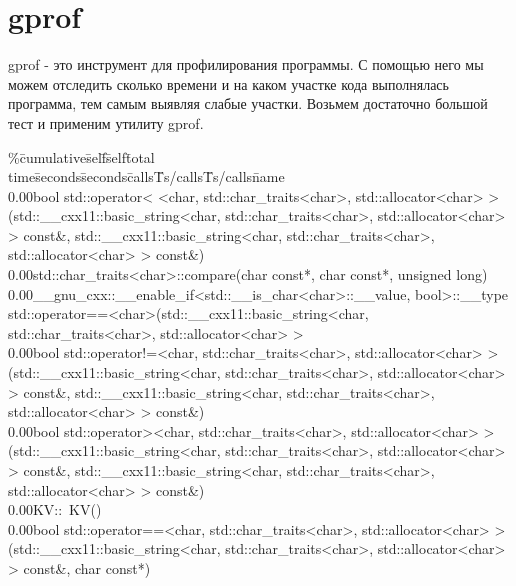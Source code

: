 \documentclass[pdf, unicode, 12pt, a4paper,oneside,fleqn]{article}
\begin{document}
\section{gprof}
gprof - это инструмент для профилирования программы. С помощью него мы можем отследить сколько времени и на каком участке кода выполнялась программа, тем самым выявляя слабые участки. Возьмем достаточно большой тест и применим утилиту gprof. \\

\begin{tabbing}
\%\quad\=cumulative\quad\=self\quad\=\qquad\qquad\qquad\=self\qquad\=total\\
time\quad\=seconds\quad\=seconds\quad\=calls\quad\=Ts/calls\quad\=Ts/calls\quad\=name\\
0.00\>bool std::operator< <char, std::char\_traits<char>, std::allocator<char> >(std::\_\_cxx11::basic\_string<char, std::char\_traits<char>, std::allocator<char> > const\&, std::\_\_cxx11::basic\_string<char, std::char\_traits<char>, std::allocator<char> > const\&) \\

0.00\>std::char\_traits<char>::compare(char const*, char const*, unsigned long) \\

0.00\>\_\_gnu\_cxx::\_\_enable\_if<std::\_\_is\_char<char>::\_\_value, bool>::\_\_type std::operator==<char>(std::\_\_cxx11::basic\_string<char, std::char\_traits<char>, std::allocator<char> >\\

0.00\>bool std::operator!=<char, std::char\_traits<char>, std::allocator<char> >(std::\_\_cxx11::basic\_string<char, std::char\_traits<char>, std::allocator<char> > const\&, std::\_\_cxx11::basic\_string<char, std::char\_traits<char>, std::allocator<char> > const\&)\\

0.00\>bool std::operator><char, std::char\_traits<char>, std::allocator<char> >(std::\_\_cxx11::basic\_string<char, std::char\_traits<char>, std::allocator<char> > const\&, std::\_\_cxx11::basic\_string<char, std::char\_traits<char>, std::allocator<char> > const\&) \\

0.00\>KV::~KV() \\

0.00\>bool std::operator==<char, std::char\_traits<char>, std::allocator<char> >(std::\_\_cxx11::basic\_string<char, std::char\_traits<char>, std::allocator<char> > const\&, char const*) \\


\end{tabbing}
\end{document}
